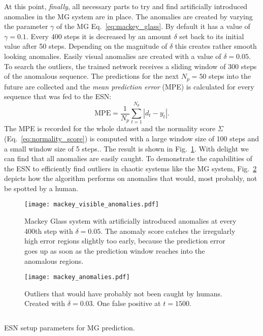 At this point, \emph{finally}, all necessary parts to try and find artificially
introduced anomalies in the MG system are in place. The anomalies are created
by varying the parameter $\gamma$ of the MG Eq.~\ref{eq:mackey_glass}.  By
default it has a value of $\gamma = 0.1$.  Every 400 steps it is decreased by
an amount $\delta$ set back to its initial value after 50 steps. Depending on
the magnitude of $\delta$ this creates rather smooth looking anomalies. Easily
visual anomalies are created with a value of $\delta = 0.05$. To search the
outliers, the trained network receives a sliding window of 300 steps of the
anomalous sequence.  The predictions for the next $N_p = 50$ steps into the
future are collected and the \emph{mean prediction error} (MPE) is calculated
for every sequence that was fed to the ESN:
\begin{equation}
  \text{MPE} = \frac{1}{N_p} \sum_{t=1}^{N_p} | d_t - y_t |.
\end{equation}
The MPE is recorded for the whole dataset and the normality score $\Sigma$
(Eq.~\ref{eq:normality_score}) is computed with a large window size of 100
steps and a small window size of 5 steps..  The result is shown in
Fig.~\ref{fig:mackey_visible_anomalies}. With delight we can find that all
anomalies are easily caught.  To demonstrate the capabilities of the ESN to
efficiently find outliers in chaotic systems like the MG system,
Fig.~\ref{fig:mackey_anomalies} depicts how the algorithm performs on
anomalies that would, most probably, not be spotted by a human.

\begin{figure}
  \centering
  \texttt{[image: mackey\_visible\_anomalies.pdf]}
  \caption{Mackey Glass system with artificially introduced anomalies at every
  400th step with $\delta=0.05$. The anomaly score catches the irregularly high error
  regions slightly too early, because the prediction error goes up as soon as the
  prediction window reaches into the anomalous regions.}
  \label{fig:mackey_visible_anomalies}
\end{figure}

\begin{figure}
  \centering
  \texttt{[image: mackey\_anomalies.pdf]}
  \caption{Outliers that would have probably not been caught by humans. Created
  with $\delta = 0.03$. One false positive at $t=1500$.}
  \label{fig:mackey_anomalies}
\end{figure}

\begin{listing}
  \inputminted{json}{pseudocode/model_setups/mackey_setup.json}
  \label{lst:mackey_setup}
  \caption{ESN setup parameters for MG prediction.}
\end{listing}






